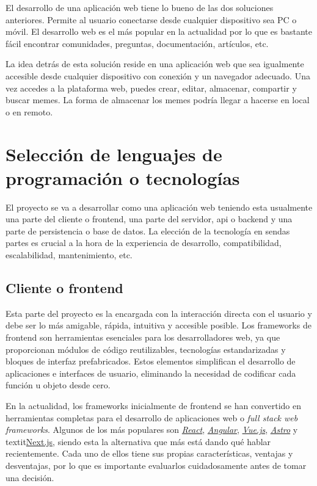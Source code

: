 El desarrollo de una aplicación web tiene lo bueno de las dos soluciones anteriores. Permite al usuario conectarse desde cualquier dispositivo sea PC o móvil. El desarrollo web es el más popular en la actualidad por lo que es bastante fácil encontrar comunidades, preguntas, documentación, artículos, etc.

La idea detrás de esta solución reside en una aplicación web que sea igualmente accesible desde cualquier dispositivo con conexión y un navegador adecuado. Una vez accedes a la plataforma web, puedes crear, editar, almacenar, compartir y buscar memes. La forma de almacenar los memes podría llegar a hacerse en local o en remoto.

\section{Selección de lenguajes de programación o tecnologías}

El proyecto se va a desarrollar como una aplicación web teniendo esta usualmente una parte del cliente o frontend, una parte del servidor, api o backend y una parte de persistencia o base de datos. La elección de la tecnología en sendas partes es crucial a la hora de la experiencia de desarrollo, compatibilidad, escalabilidad, mantenimiento, etc.

\subsection{Cliente o frontend}

Esta parte del proyecto es la encargada con la interacción directa con el usuario y debe ser lo más amigable, rápida, intuitiva y accesible posible. Los frameworks de frontend son herramientas esenciales para los desarrolladores web, ya que proporcionan módulos de código reutilizables, tecnologías estandarizadas y bloques de interfaz prefabricados. Estos elementos simplifican el desarrollo de aplicaciones e interfaces de usuario, eliminando la necesidad de codificar cada función u objeto desde cero.

En la actualidad, los frameworks inicialmente de frontend se han convertido en herramientas completas para el desarrollo de aplicaciones web o \textit{full stack web frameworks}. Algunos de los más populares son \textit{\href{https://es.react.dev/}{React}}, \textit{\href{https://angular.dev/}{Angular}}, \textit{\href{https://vuejs.org/}{Vue.js}}, \textit{\href{https://astro.build/}{Astro}} y textit{\href{https://nextjs.org/}{Next.js}}, siendo esta la alternativa que más está dando qué hablar recientemente. Cada uno de ellos tiene sus propias características, ventajas y desventajas, por lo que es importante evaluarlos cuidadosamente antes de tomar una decisión.

